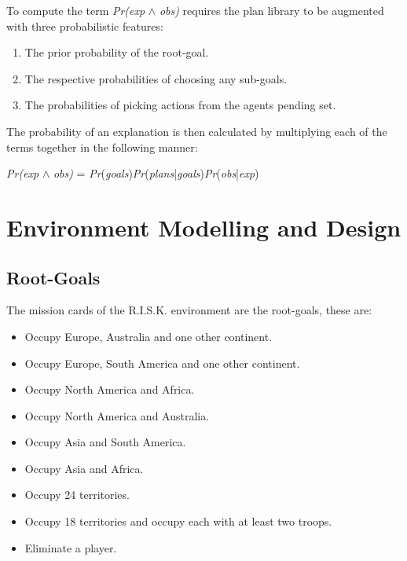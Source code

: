 \documentclass[parskip]{cs4rep}
\begin{document}
To compute the term \textit{Pr(exp} $\wedge$ \textit{obs)} requires the plan library to be augmented with three probabilistic features:\newline

\begin{enumerate}
\item
The prior probability of the root-goal.
\item
The respective probabilities of choosing any sub-goals.
\item
The probabilities of picking actions from the agents pending set.\newline
\end{enumerate}

The probability of an explanation is then calculated by multiplying each of the terms together in the following manner: \newline

\centerline{
\textit{Pr(exp} $\wedge$ \textit{obs)} = \textit{Pr}(\textit{goals})\textit{Pr}(\textit{plans}|\textit{goals})\textit{Pr}(\textit{obs}|\textit{exp})
}

\section{Environment Modelling and Design}

\subsection{Root-Goals}

The mission cards of the R.I.S.K. environment are the root-goals, these are:

\begin{itemize}
\item
Occupy Europe, Australia and one other continent.
\item
Occupy Europe, South America and one other continent.
\item
Occupy North America and Africa.
\item
Occupy North America and Australia.
\item
Occupy Asia and South America.
\item
Occupy Asia and Africa.
\item
Occupy 24 territories.
\item
Occupy 18 territories and occupy each with at least two troops.
\item
Eliminate a player.
\end{itemize}
\end{document}
